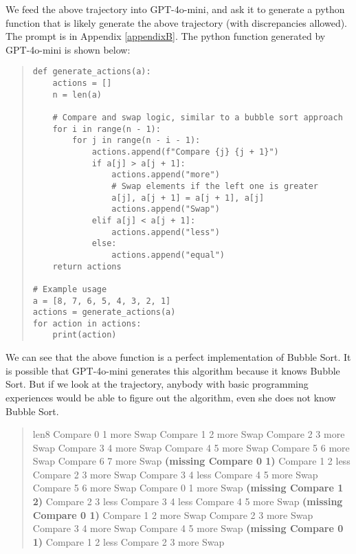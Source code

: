 \documentclass[pdflatex,sn-mathphys-num]{sn-jnl}%
\theoremstyle{thmstyleone}%
\theoremstyle{thmstyletwo}%
\theoremstyle{thmstylethree}%
\begin{document}
We feed the above trajectory into GPT-4o-mini, and ask it to generate a python function that is likely generate the above trajectory (with discrepancies allowed). The prompt is in Appendix \ref{appendixB}. The python function generated by GPT-4o-mini is shown below:

\begin{quote}

\begin{verbatim}
def generate_actions(a):
    actions = []
    n = len(a)

    # Compare and swap logic, similar to a bubble sort approach
    for i in range(n - 1):
        for j in range(n - i - 1):
            actions.append(f"Compare {j} {j + 1}")
            if a[j] > a[j + 1]:
                actions.append("more")
                # Swap elements if the left one is greater
                a[j], a[j + 1] = a[j + 1], a[j]
                actions.append("Swap")
            elif a[j] < a[j + 1]:
                actions.append("less")
            else:
                actions.append("equal")
    return actions

# Example usage
a = [8, 7, 6, 5, 4, 3, 2, 1]
actions = generate_actions(a)
for action in actions:
    print(action)
\end{verbatim}

\end{quote}

We can see that the above function is a perfect implementation of Bubble Sort. It is possible that GPT-4o-mini generates this algorithm because it knows Bubble Sort. But if we look at the trajectory, anybody with basic programming experiences would be able to figure out the algorithm, even she does not know Bubble Sort.

\begin{quote}

len8 Compare 0 1 more Swap Compare 1 2 more Swap Compare 2 3 more Swap Compare 3 4 more Swap Compare 4 5 more Swap Compare 5 6 more Swap Compare 6 7 more Swap \textbf{(missing Compare 0 1)} Compare 1 2 less Compare 2 3 more Swap Compare 3 4 less Compare 4 5 more Swap Compare 5 6 more Swap Compare 0 1 more Swap \textbf{(missing Compare 1 2)} Compare 2 3 less Compare 3 4 less Compare 4 5 more Swap \textbf{(missing Compare 0 1)} Compare 1 2 more Swap Compare 2 3 more Swap Compare 3 4 more Swap Compare 4 5 more Swap \textbf{(missing Compare 0 1)} Compare 1 2 less Compare 2 3 more Swap

\end{quote}
\end{document}
